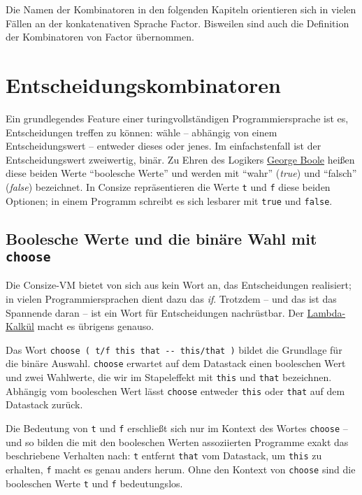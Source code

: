 Die Namen der Kombinatoren in den folgenden Kapiteln orientieren sich in vielen Fällen an der konkatenativen Sprache Factor. Bisweilen sind auch die Definition der Kombinatoren von Factor übernommen.

\section{Entscheidungskombinatoren}

Ein grundlegendes Feature einer turingvollständigen Programmiersprache ist es, Entscheidungen treffen zu können: wähle -- abhängig von einem Entscheidungswert -- entweder dieses oder jenes. Im einfachstenfall ist der Entscheidungswert zweiwertig, binär. Zu Ehren des Logikers \href{http://de.wikipedia.org/wiki/George\_Boole}{{\sc George Boole}} heißen diese beiden Werte "`boolesche Werte"' und werden mit "`wahr"' (\emph{true}) und "`falsch"' (\emph{false}) bezeichnet. In Consize repräsentieren die Werte \verb|t| und \verb|f| diese beiden Optionen; in einem Programm schreibt es sich lesbarer mit \verb|true| und \verb|false|.

\subsection{Boolesche Werte und die binäre Wahl mit \texttt{choose}}

Die Consize-VM bietet von sich aus kein Wort an, das Entscheidungen realisiert; in vielen Programmiersprachen dient dazu das \emph{if}. Trotzdem -- und das ist das Spannende daran -- ist ein Wort für Entscheidungen nachrüstbar. Der \href{http://en.wikipedia.org/wiki/Lambda_calculus}{Lambda-Kalkül} macht es übrigens genauso.

Das Wort \verb|choose ( t/f this that -- this/that )| bildet die Grundlage für die binäre Auswahl. \verb|choose| erwartet auf dem Datastack einen booleschen Wert und zwei Wahlwerte, die wir im Stapeleffekt mit \verb|this| und \verb|that| bezeichnen. Abhängig vom booleschen Wert lässt \verb|choose| entweder \verb|this| oder \verb|that| auf dem Datastack zurück.

Die Bedeutung von \verb|t| und \verb|f| erschließt sich nur im Kontext des Wortes \verb|choose| -- und so bilden die mit den booleschen Werten assoziierten Programme exakt das beschriebene Verhalten nach: \verb|t| entfernt \verb|that| vom Datastack, um \verb|this| zu erhalten, \verb|f| macht es genau anders herum. Ohne den Kontext von \verb|choose| sind die booleschen Werte \verb|t| und \verb|f| bedeutungslos. 

